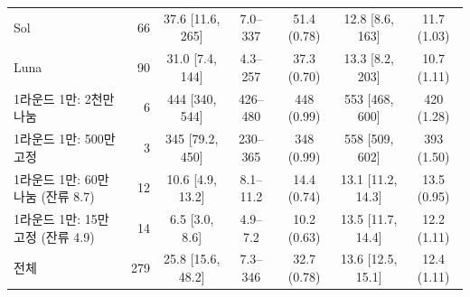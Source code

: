 \begin{table}[t]
{\begin{tabular}{lrccccc}
Sol & 66 & 37.6 [11.6, 265] & 7.0--337 & 51.4 (0.78) & 12.8 [8.6, 163] & 11.7 (1.03) \\
Luna & 90 & 31.0 [7.4, 144] & 4.3--257 & 37.3 (0.70) & 13.3 [8.2, 203] & 10.7 (1.11) \\
\midrule
1라운드 1만: 2천만 나눔 & 6 & 444 [340, 544] & 426--480 & 448 (0.99) & 553 [468, 600] & 420 (1.28) \\
1라운드 1만: 500만 고정 & 3 & 345 [79.2, 450] & 230--365 & 348 (0.99) & 558 [509, 602] & 393 (1.50) \\
1라운드 1만: 60만 나눔 (잔류 8.7) & 12 & 10.6 [4.9, 13.2] & 8.1--11.2 & 14.4 (0.74) & 13.1 [11.2, 14.3] & 13.5 (0.95) \\
1라운드 1만: 15만 고정 (잔류 4.9) & 14 & 6.5 [3.0, 8.6] & 4.9--7.2 & 10.2 (0.63) & 13.5 [11.7, 14.4] & 12.2 (1.11) \\
\midrule
전체 & 279 & 25.8 [15.6, 48.2] & 7.3--346 & 32.7 (0.78) & 13.6 [12.5, 15.1] & 12.4 (1.11) \\
\bottomrule
\end{tabular}}
\end{table}

